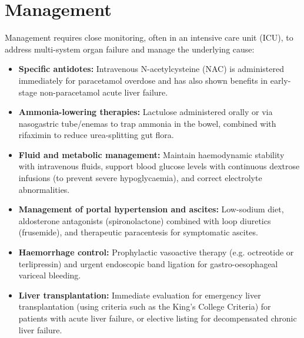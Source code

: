 \section*{Management}
Management requires close monitoring, often in an intensive care unit (ICU), to address multi-system organ failure and manage the underlying cause:
\begin{itemize}
    \item \textbf{Specific antidotes:} Intravenous N-acetylcysteine (NAC) is administered immediately for paracetamol overdose and has also shown benefits in early-stage non-paracetamol acute liver failure.
    \item \textbf{Ammonia-lowering therapies:} Lactulose administered orally or via nasogastric tube/enemas to trap ammonia in the bowel, combined with rifaximin to reduce urea-splitting gut flora.
    \item \textbf{Fluid and metabolic management:} Maintain haemodynamic stability with intravenous fluids, support blood glucose levels with continuous dextrose infusions (to prevent severe hypoglycaemia), and correct electrolyte abnormalities.
    \item \textbf{Management of portal hypertension and ascites:} Low-sodium diet, aldosterone antagonists (spironolactone) combined with loop diuretics (frusemide), and therapeutic paracentesis for symptomatic ascites.
    \item \textbf{Haemorrhage control:} Prophylactic vasoactive therapy (e.g. octreotide or terlipressin) and urgent endoscopic band ligation for gastro-oesophageal variceal bleeding.
    \item \textbf{Liver transplantation:} Immediate evaluation for emergency liver transplantation (using criteria such as the King's College Criteria) for patients with acute liver failure, or elective listing for decompensated chronic liver failure.
\end{itemize}

